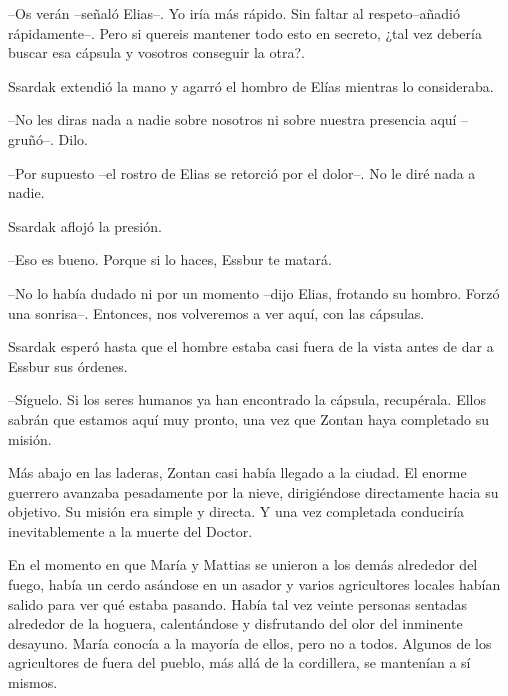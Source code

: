 --Os verán --señaló Elias--. Yo iría más rápido. Sin faltar al respeto--añadió rápidamente--. Pero si quereis mantener todo esto en secreto, ¿tal vez debería buscar esa cápsula y vosotros conseguir la otra?.



Ssardak extendió la mano y agarró el hombro de Elías mientras lo consideraba. 

--No les diras nada a nadie sobre nosotros ni sobre nuestra presencia aquí --gruñó--. Dilo.



--Por supuesto --el rostro de Elias se retorció por el dolor--. No le diré nada a nadie.



Ssardak aflojó la presión. 


--Eso es bueno. Porque si lo haces, Essbur te matará. 


--No lo había dudado ni por un momento --dijo Elias, frotando su hombro. Forzó una sonrisa--. Entonces, nos volveremos a ver aquí, con las cápsulas.



Ssardak esperó hasta que el hombre estaba casi fuera de la vista antes de dar a Essbur sus órdenes. 


--Síguelo. Si los seres humanos ya han encontrado la cápsula, recupérala. Ellos sabrán que estamos aquí muy pronto, una vez que Zontan haya completado su misión.



\mbox{}



Más abajo en las laderas, Zontan casi había llegado a la ciudad. El enorme guerrero avanzaba pesadamente por la nieve, dirigiéndose directamente hacia su objetivo. Su misión era simple y directa. Y una vez completada conduciría inevitablemente a la muerte del Doctor.



\mbox{}



En el momento en que María y Mattias se unieron a los demás alrededor del fuego, había un cerdo asándose en un asador y varios agricultores locales habían salido para ver qué estaba pasando. Había tal vez veinte personas sentadas alrededor de la hoguera, calentándose y disfrutando del olor del inminente desayuno. María conocía a la mayoría de ellos, pero no a todos. Algunos de los agricultores de fuera del pueblo, más allá de la cordillera, se mantenían a sí mismos.



